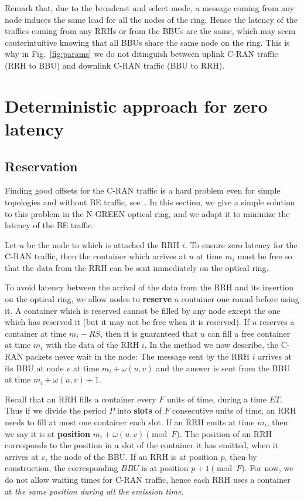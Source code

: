 \documentclass[10pt, conference, letterpaper]{IEEEtran}
\begin{document}
Remark that, due to the broadcast and select mode, a message coming from any node induces the same load for all the nodes of the ring. Hence the latency of the traffics coming from any RRHs or from the BBUs are the same, which may seem couterintuitive knowing that all BBUs share the same node on the ring. This is why in Fig.~\ref{fig:params} we do not ditinguish between uplink C-RAN traffic (RRH to BBU) and downlink  C-RAN traffic (BBU to RRH).

\section{Deterministic approach for zero latency} \label{sec:deterministicalgorithms}
\subsection{Reservation}
Finding good offsets for the C-RAN traffic is a hard problem even for simple topologies and without BE traffic, see~\cite{dominique2018deterministic}. In this section, we give a simple solution to this problem in the N-GREEN optical ring, and we adapt it to minimize the latency of the BE traffic.

Let $u$ be the node to which is attached the RRH $i$. To ensure zero latency for the C-RAN traffic, then the container which arrives at $u$ at time $m_i$ must be free so that the data from the RRH can be sent immediately on the optical ring. 

To avoid latency between the arrival of the data from the RRH and its insertion on the optical ring, 
we allow nodes to \textbf{reserve} a container one round before using it. A container which is reserved cannot be filled by any node except the one which has reserved it (but it may not be free when it is reserved). 
If $u$ reserves a container at time $m_i - RS$, then it is guaranteed that $u$ can fill a free container at time $m_i$ with the data of the RRH $i$.
In the method we now describe, the C-RAN packets never wait in the node: The message sent by the RRH $i$ arrives at its BBU at node $v$ at time $m_i + \omega(u,v)$ and the answer is sent from the BBU at time $m_i + \omega(u,v) +1$.

Recall that an RRH fills a container every $F$ units of time, during a time $ET$. 
Thus if we divide the period $P$ into \textbf{slots} of $F$ consecutive units of time, an RRH needs to fill at most one container each slot. If an RRH emits at time $m_i$, then we say it is at \textbf{position} $m_i + \omega(u,v)\pmod F$.
The position of an RRH corresponds to the position in a slot of the container it has emitted, when it arrives at $v$, the node of the BBU. 
If an RRH is at position $p$, then by construction, the corresponding $BBU$ is at position $p+1\pmod F$. For now, we do not allow waiting times for C-RAN traffic, hence each RRH uses a container at \emph{the same position during all the emission time}. 
\end{document}
